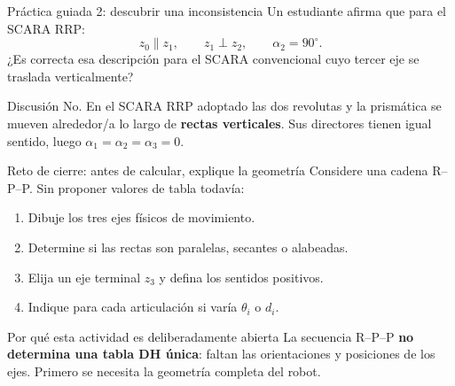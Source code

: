 \documentclass[aspectratio=169,11pt]{beamer}
\begin{document}
\begin{frame}[t]{Práctica guiada 2: descubrir una inconsistencia}
 \small
 Un estudiante afirma que para el SCARA RRP:
 \[
 z_0\parallel z_1,\qquad z_1\perp z_2,
 \qquad\alpha_2=90^\circ.
 \]
 \pause
 ¿Es correcta esa descripción para el SCARA convencional
 cuyo tercer eje se traslada verticalmente?
 \pause
 \begin{alertblock}{Discusión}
 No. En el SCARA RRP adoptado las dos revolutas y la prismática
 se mueven alrededor/a lo largo de \textbf{rectas verticales}.
 Sus directores tienen igual sentido, luego
 $\alpha_1=\alpha_2=\alpha_3=0$.
 \end{alertblock}
\end{frame}

\begin{frame}[t]{Reto de cierre: antes de calcular, explique la geometría}
 \small
 Considere una cadena R--P--P. Sin proponer valores de tabla todavía:
 \begin{enumerate}
  \item Dibuje los tres ejes físicos de movimiento.
  \item Determine si las rectas son paralelas, secantes o alabeadas.
  \item Elija un eje terminal $z_3$ y defina los sentidos positivos.
  \item Indique para cada articulación si varía $\theta_i$ o $d_i$.
 \end{enumerate}
 \pause
 \begin{block}{Por qué esta actividad es deliberadamente abierta}
 La secuencia R--P--P \textbf{no determina una tabla DH única}:
 faltan las orientaciones y posiciones de los ejes.
 Primero se necesita la geometría completa del robot.
 \end{block}
\end{frame}
\end{document}
